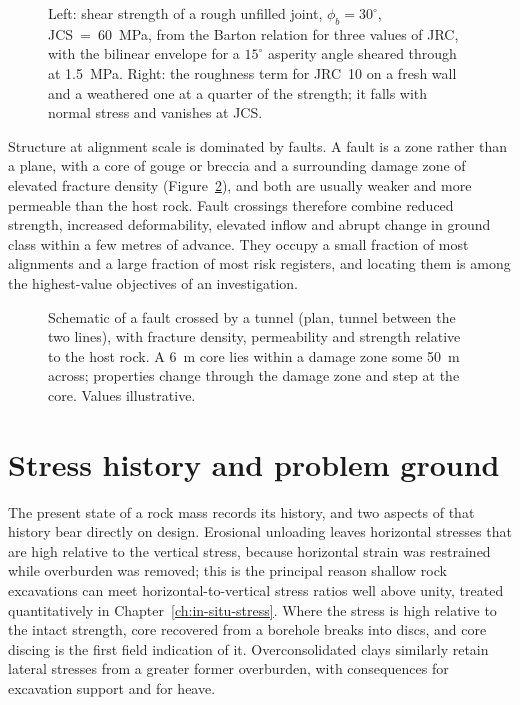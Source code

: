 \begin{figure}[htbp]
\centering
{}
\caption{Left: shear strength of a rough unfilled joint, $\phi_b = 30^\circ$,
JCS~=~60~MPa, from the Barton relation for three values of JRC, with the
bilinear envelope for a $15^\circ$ asperity angle sheared through at
1.5~MPa. Right: the roughness term for JRC~10 on a fresh wall and a weathered
one at a quarter of the strength; it falls with normal stress and vanishes at JCS.}
\label{fig:geo-joint-shear}
\end{figure}

Structure at alignment scale is dominated by faults. A fault is a zone
rather than a plane, with a core of gouge or breccia and a surrounding damage zone of
elevated fracture density (Figure~\ref{fig:geo-fault-zone}), and both are usually weaker and more permeable than
the host rock. Fault crossings therefore combine reduced strength, increased
deformability, elevated inflow and abrupt change in ground class within a few
metres of advance. They occupy a small fraction of most alignments and a large
fraction of most risk registers, and locating them is among the highest-value
objectives of an investigation.

\begin{figure}[htbp]
\centering
{}
\caption{Schematic of a fault crossed by a tunnel (plan, tunnel between the
two lines), with fracture density, permeability and strength relative to the
host rock. A 6~m core lies within a damage zone some 50~m across; properties
change through the damage zone and step at the core. Values illustrative.}
\label{fig:geo-fault-zone}
\end{figure}

\section{Stress history and problem ground}
\label{sec:stress-history-problem-ground}

The present state of a rock mass records its history, and two aspects of that
history bear directly on design. Erosional unloading leaves horizontal
stresses that are high relative to the vertical stress, because horizontal
strain was restrained while overburden was removed; this is the principal
reason shallow rock excavations can meet horizontal-to-vertical stress ratios
well above unity, treated quantitatively in
Chapter~\ref{ch:in-situ-stress}. Where the stress is high relative to the
intact strength, core recovered from a borehole breaks into discs, and core
discing is the first field indication of it. Overconsolidated clays similarly retain
lateral stresses from a greater former overburden, with consequences for
excavation support and for heave.

